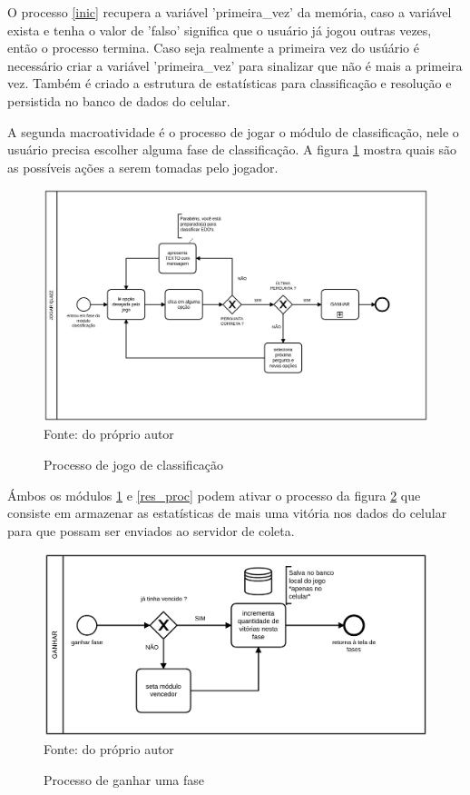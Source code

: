 O processo \ref{inic} recupera a variável 'primeira\_vez' da memória, caso a variável exista e tenha o valor de 'falso' significa que o usuário já jogou outras vezes, então o processo termina. Caso seja realmente a primeira vez do usúário é necessário criar a variável 'primeira\_vez' para sinalizar que não é mais a primeira vez. Também é criado a estrutura de estatísticas para classificação e resolução e persistida no banco de dados do celular.

A segunda macro\-atividade é o processo de jogar o módulo de classificação, nele o usuário precisa escolher alguma fase de classificação. A figura \ref{class_proc} mostra quais são as possíveis ações a serem tomadas pelo jogador.

\begin{figure}[H]
\centering
\caption{Processo de jogo de classificação}
\includegraphics[scale=0.15]{figuras/processos/processo_classificacao.png}
\label{class_proc}
\small{Fonte: do próprio autor}
\end{figure}

Ámbos os módulos \ref{class_proc} e \ref{res_proc} podem ativar o processo da figura \ref{ganhar_proc} que consiste em armazenar as estatísticas de mais uma vitória nos dados do celular para que possam ser enviados ao servidor de coleta.


\begin{figure}[H]
\centering
\caption{Processo de ganhar uma fase}
\includegraphics[scale=0.23]{figuras/processos/processo_ganhar.png}
\label{ganhar_proc}
\small{Fonte: do próprio autor}
\end{figure}


